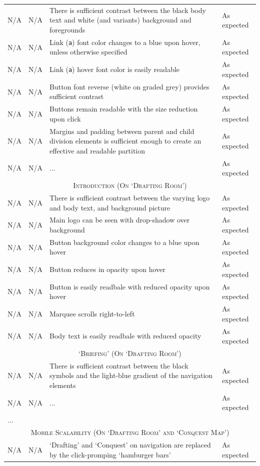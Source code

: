 \documentclass[11pt, english]{article}
\begin{document}
\begin{center}
\begin{longtable}{p{2.5cm}p{3.5cm}p{5cm}p{1.75cm}}
		N/A & N/A & There is sufficient contrast between the black body text and white (and variants) background and foregrounds & As expected\\
		N/A & N/A & Link (\texttt{a}) font color changes to a blue upon hover, unless otherwise specified & As expected\\
		N/A & N/A & Link (\texttt{a}) hover font color is easily readable & As expected\\
		N/A & N/A & Button font reverse (white on graded grey) provides sufficient contrast & As expected\\
		N/A & N/A & Buttons remain readable with the size reduction upon click & As expected\\
		N/A & N/A & Margins and padding between parent and child division elements is sufficient enough to create an effective and readable partition & As expected\\
		N/A & N/A & ... & As expected\\
		\hline
		\multicolumn{4}{c}{\textsc{Introduction (On `Drafting Room')}}\\
		\hline
		N/A & N/A & There is sufficient contrast between the varying logo and body text, and background picture & As expected\\
		N/A & N/A & Main logo can be seen with drop-shadow over background & As expected\\
		N/A & N/A & Button background color changes to a blue upon hover & As expected\\
		N/A & N/A & Button reduces in opacity upon hover & As expected\\
		N/A & N/A & Button is easily readbale with reduced opacity upon hover & As expected\\
		N/A & N/A & Marquee scrolls right-to-left & As expected\\
		N/A & N/A & Body text is easily readbale with reduced opacity & As expected\\
		\hline
		\multicolumn{4}{c}{\textsc{`Briefing' (On `Drafting Room')}}\\
		\hline
		N/A & N/A & There is sufficient contrast between the black symbols and the light-blue gradient of the navigation elements & As expected\\
		N/A & N/A & ... & As expected\\
		\hline
		...\\
		\hline
		\multicolumn{4}{c}{\textsc{Mobile Scalability (On `Drafting Room' and `Conquest Map')}}\\
		\hline
		N/A & N/A & `Drafting' and `Conquest' on navigation are replaced by the click-promping `hamburger bars' & As expected\\

\end{longtable}
\end{center}
\end{document}
